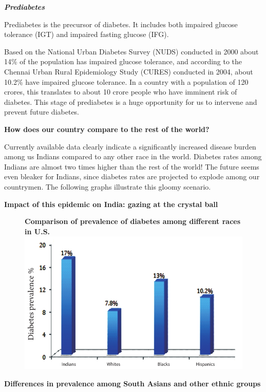 \vskip 8pt
\noindent\textbf{\textit{Prediabetes}}

Prediabetes is the precursor of diabetes. It includes both impaired glucose tolerance (IGT) and impaired fasting glucose (IFG).

Based on the National Urban Diabetes Survey (NUDS) conducted in 2000 about 14\% of the population has impaired glucose tolerance, and according to the Chennai Urban Rural Epidemiology Study (CURES) conducted in 2004, about 10.2\% have impaired glucose tolerance. In a country with a population of 120 crores, this translates to about 10 crore people who have imminent risk of diabetes. This stage of prediabetes is a huge opportunity for us to intervene and prevent future diabetes.

\vskip 8pt
\noindent\textbf{How does our country compare to the rest of the world?}

Currently available data clearly indicate a significantly increased disease burden among us Indians compared to any other race in the world. Diabetes rates among Indians are almost two times higher than the rest of the world! The future seems even bleaker for Indians, since diabetes rates are projected to explode among our countrymen. The following graphs illustrate this gloomy scenario.

\noindent\textbf{Impact of this epidemic on India: gazing at the crystal ball}

\begin{figure}[h]
\centering
{\small\textbf{Comparison of prevalence of diabetes among different races in U.S.}}\\
\includegraphics[scale=2.1]{images/031.jpg}
\end{figure}

\noindent\textbf{Differences in prevalence among South Asians and other ethnic groups}

